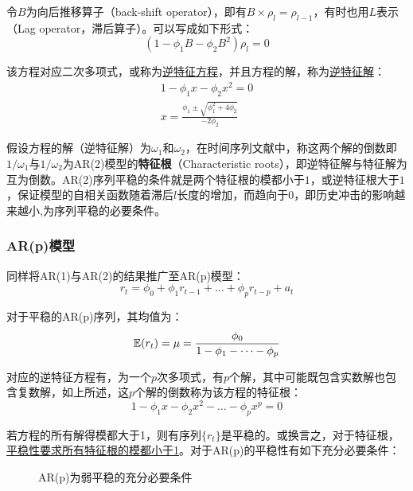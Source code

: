 \documentclass[11pt]{article}
\begin{document}
令$B$为向后推移算子（back-shift operator），即有$B \times \rho_l = \rho_{l-1}$，有时也用$L$表示（Lag operator，滞后算子）。可以写成如下形式：
\begin{equation*}
    (1-\phi_1 B - \phi_2 B^2)\rho_l = 0
\end{equation*}

该方程对应二次多项式，或称为\uline{逆特征方程}，并且方程的解，称为\uline{逆特征解}：
\begin{gather*}
    1 - \phi_1 x - \phi_2 x^2 = 0 \\
    x = \frac{\phi_1 \pm \sqrt{\phi_{1}^{2} + 4\phi_2}}{-2\phi_2}
\end{gather*}

假设方程的解（逆特征解）为$\omega_1$和$\omega_2$，在时间序列文献中，称这两个解的倒数即$1/\omega_1$与$1/\omega_2$为AR(2)模型的\textbf{特征根}（Characteristic roots），即逆特征解与特征解为互为倒数。AR(2)序列平稳的条件就是两个特征根的模都小于$1$，或逆特征根大于$1$，保证模型的自相关函数随着滞后$l$长度的增加，而趋向于$0$，即历史冲击的影响越来越小,为序列平稳的必要条件。

\subsubsection*{AR(p)模型}

同样将AR(1)与AR(2)的结果推广至AR(p)模型：
\begin{equation*}
    r_t = \phi_0 + \phi_1 r_{t-1} + \dots + \phi_p r_{t-p} + a_t
\end{equation*}

对于平稳的AR(p)序列，其均值为：
\begin{equation*}
    \mathbb{E}(r_t) = \mu = \frac{\phi_0}{1 - \phi_1 - \dots - \phi_p}
\end{equation*}

对应的逆特征方程有，为一个$p$次多项式，有$p$个解，其中可能既包含实数解也包含复数解，如上所述，这$p$个解的倒数称为该方程的特征根：
\begin{equation*}
    1 - \phi_1 x - \phi_2 x^2 - \dots - \phi_p x^p= 0
\end{equation*}

若方程的所有解得模都大于1，则有序列$\{r_t\}$是平稳的。或换言之，对于特征根，\uline{平稳性要求所有特征根的模都小于1}。对于AR(p)的平稳性有如下充分必要条件：
\begin{figure}[H]
\centering
\caption{AR(p)为弱平稳的充分必要条件}
\end{figure}
\end{document}
